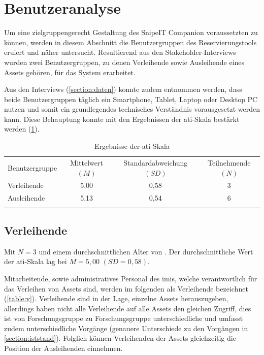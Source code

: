\section{Benutzeranalyse}
\label{section:benutzer}
Um eine zielgruppengerecht Gestaltung des SnipeIT Companion voraussetzten zu können, werden in
diesem Abschnitt die Benutzergruppen des Reservierungstools eruiert und näher untersucht.
Resultierend aus den Stakeholder-Interviews wurden zwei Benutzergruppen, zu denen Verleihende sowie
Ausleihende eines Assets gehören, für das System erarbeitet.

Aus den Interviews (\ref{section:daten}) konnte zudem entnommen werden, dass beide Benutzergruppen
täglich ein Smartphone, Tablet, Laptop oder Desktop PC nutzen und somit ein grundlegendes
technisches Verständnis vorausgesetzt werden kann. Diese Behauptung konnte mit den Ergebnissen der
\ac{ati}-Skala bestärkt werden (\ref{table:ati}). 

\begin{table}[h]
        \centering
        \caption{Ergebnisse der \ac{ati}-Skala}
        \begin{tabular}{lccc}
                \arrayrulecolor{maincolor}\hline
                \sffamily\color{maincolor}Benutzergruppe & \sffamily\color{maincolor}Mittelwert $(M)$&
                \sffamily\color{maincolor}Standardabweichung $(SD)$ &
                \sffamily\color{maincolor}Teilnehmende $(N)$
                \\
                \arrayrulecolor{maincolor}\hline
                Verleihende & 5,00                                 & 0,58 & 3\\
                Ausleihende & 5,13                                 & 0,54 & 6\\
                \arrayrulecolor{maincolor}\hline
        \end{tabular}
        \label{table:ati}
\end{table}


\subsection*{Verleihende}
Mit $N=3$ und einem durchschnittlichen Alter von .
Der durchschnittliche Wert der \ac{ati}-Skala lag bei $M=5,00$ $(SD=0,58)$.


Mitarbeitende, sowie administratives Personal des \ac{imis}, welche verantwortlich für das Verleihen
von Assets sind, werden im folgenden als Verleihende bezeichnet (\ref{table:v}). Verleihende sind in
der Lage, einzelne Assets herauszugeben, allerdings haben nicht alle Verleihende auf alle Assets den
gleichen Zugriff, dies ist von Forschungsgruppe zu Forschungsgruppe unterschiedliche und umfasst
zudem unterschiedliche Vorgänge (genauere Unterschiede zu den Vorgängen in \ref{section:iststand}).
Folglich können Verleihenden der Assets gleichzeitig die Position der Ausleihenden einnehmen.

